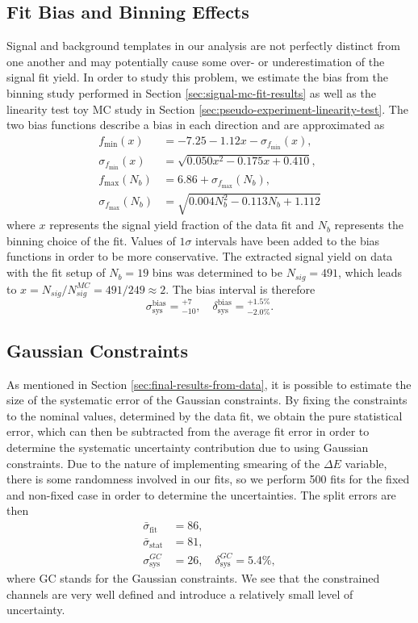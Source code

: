 \subsection{Fit Bias and Binning Effects}
Signal and background templates in our analysis are not perfectly distinct from one another and may potentially cause some over- or underestimation of the signal fit yield. In order to study this problem, we estimate the bias from the binning study performed in Section \ref{sec:signal-mc-fit-results} as well as the linearity test toy MC study in Section \ref{sec:pseudo-experiment-linearity-test}. The two bias functions describe a bias in each direction and are approximated as
\begin{align}
f_{\mathrm{min}}(x) &= -7.25-1.12x - \sigma_{f_{\mathrm{min}}}(x), \\
\sigma_{f_{\mathrm{min}}}(x) &= \sqrt{0.050 x^2 - 0.175 x + 0.410}, \\
f_{\mathrm{max}}(N_b) &= 6.86 + \sigma_{f_{\mathrm{max}}}(N_b), \\
\sigma_{f_{\mathrm{max}}}(N_b) &= \sqrt{0.004N_b^2 - 0.113 N_b + 1.112}
\end{align}
where $x$ represents the signal yield fraction of the data fit and $N_b$ represents the binning choice of the fit. Values of $1\sigma$ intervals have been added to the bias functions in order to be more conservative. The extracted signal yield on data  with the fit setup of $N_b=19$ bins was determined to be $N_{sig} = 491$, which leads to $x = N_{sig} / N_{sig}^{MC} = 491 / 249 \approx 2$. The bias interval is therefore
\begin{equation}
\sigma_{\mathrm{sys}}^{\mathrm{bias}} = {}^{+7}_{-10},\quad \delta_{\mathrm{sys}}^{\mathrm{bias}} = {}^{+1.5\%}_{-2.0\%}.
\end{equation}

\subsection{Gaussian Constraints}
As mentioned in Section \ref{sec:final-results-from-data}, it is possible to estimate the size of the systematic error of the Gaussian constraints. By fixing the constraints to the nominal values, determined by the data fit, we obtain the pure statistical error, which can then be subtracted from the average fit error in order to determine the systematic uncertainty contribution due to using Gaussian constraints. Due to the nature of implementing smearing of the $\Delta E$ variable, there is some randomness involved in our fits, so we perform 500 fits for the fixed and non-fixed case in order to determine the uncertainties. The split errors are then
\begin{align}
\bar \sigma_{\mathrm{fit}} &= 86, \\
\bar \sigma_{\mathrm{stat}} &= 81, \\
\sigma_{\mathrm{sys}}^{GC} &= 26,\quad \delta_{\mathrm{sys}}^{GC} = 5.4\%,
\end{align}
where GC stands for the Gaussian constraints. We see that the constrained channels are very well defined and introduce a relatively small level of uncertainty.


